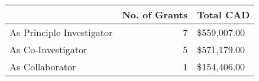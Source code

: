 \begin{tabular}{lrl}
\toprule
 & No. of Grants & Total CAD \\
\midrule
As Principle Investigator & 7 & \$559,007.00 \\
As Co-Investigator & 5 & \$571,179.00 \\
As Collaborator & 1 & \$154,406.00 \\
\bottomrule
\end{tabular}
